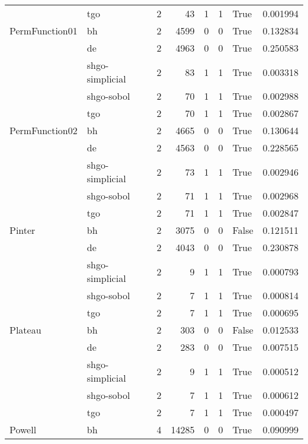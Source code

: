 \begin{longtable}{llrrrrlr}
         & tgo &     2 &       43 &      1 &       1 &    True &    0.001994 \\
PermFunction01 & bh &     2 &     4599 &      0 &       0 &    True &    0.132834 \\
         & de &     2 &     4963 &      0 &       0 &    True &    0.250583 \\
         & shgo-simplicial &     2 &       83 &      1 &       1 &    True &    0.003318 \\
         & shgo-sobol &     2 &       70 &      1 &       1 &    True &    0.002988 \\
         & tgo &     2 &       70 &      1 &       1 &    True &    0.002867 \\
PermFunction02 & bh &     2 &     4665 &      0 &       0 &    True &    0.130644 \\
         & de &     2 &     4563 &      0 &       0 &    True &    0.228565 \\
         & shgo-simplicial &     2 &       73 &      1 &       1 &    True &    0.002946 \\
         & shgo-sobol &     2 &       71 &      1 &       1 &    True &    0.002968 \\
         & tgo &     2 &       71 &      1 &       1 &    True &    0.002847 \\
Pinter & bh &     2 &     3075 &      0 &       0 &   False &    0.121511 \\
         & de &     2 &     4043 &      0 &       0 &    True &    0.230878 \\
         & shgo-simplicial &     2 &        9 &      1 &       1 &    True &    0.000793 \\
         & shgo-sobol &     2 &        7 &      1 &       1 &    True &    0.000814 \\
         & tgo &     2 &        7 &      1 &       1 &    True &    0.000695 \\
Plateau & bh &     2 &      303 &      0 &       0 &   False &    0.012533 \\
         & de &     2 &      283 &      0 &       0 &    True &    0.007515 \\
         & shgo-simplicial &     2 &        9 &      1 &       1 &    True &    0.000512 \\
         & shgo-sobol &     2 &        7 &      1 &       1 &    True &    0.000612 \\
         & tgo &     2 &        7 &      1 &       1 &    True &    0.000497 \\
Powell & bh &     4 &    14285 &      0 &       0 &    True &    0.090999 \\

\end{longtable}
